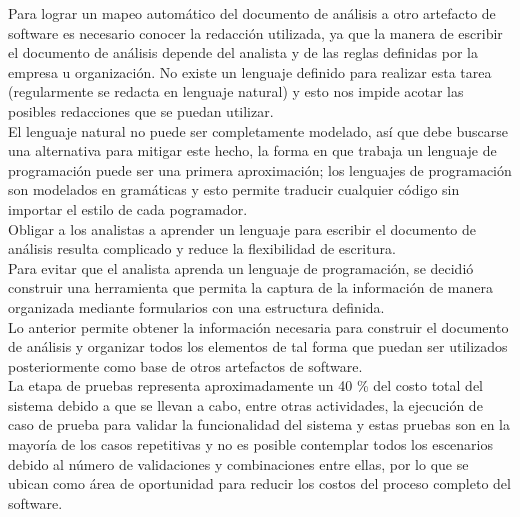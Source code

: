 Para lograr un mapeo automático del documento de análisis a otro artefacto de software es necesario conocer la redacción utilizada, ya que la manera de escribir 
el documento de análisis depende del analista y de las reglas definidas por la empresa u organización. No existe un lenguaje definido para realizar esta tarea
(regularmente se redacta en lenguaje natural) y esto nos impide acotar las posibles redacciones que se puedan utilizar.\\

El lenguaje natural no puede ser completamente modelado, así que debe buscarse una alternativa para mitigar este hecho, la forma en que trabaja un lenguaje de programación 
puede ser una primera aproximación; los lenguajes de programación son modelados en gramáticas y esto permite traducir cualquier código sin importar el estilo de cada pogramador. \\

Obligar a los analistas a aprender un lenguaje para escribir el documento de análisis resulta complicado y reduce la flexibilidad de escritura. \\

Para evitar que el analista aprenda un lenguaje de programación, se decidió construir una herramienta que permita la
captura de la información de manera organizada mediante formularios con una
estructura definida.\\

Lo anterior permite obtener la información necesaria para construir el documento de análisis y 
organizar todos los elementos de tal forma que puedan ser utilizados posteriormente como base de otros 
artefactos de software.\\

La etapa de pruebas representa aproximadamente un 40 \% del costo total del sistema debido a que se llevan a cabo, entre otras actividades, la ejecución de 
caso de prueba para validar la funcionalidad del sistema y estas pruebas son en la mayoría de los casos repetitivas y no es posible contemplar todos los escenarios
debido al número de validaciones y combinaciones entre ellas, por lo que se ubican como área de oportunidad
para reducir los costos del proceso completo del software.\\